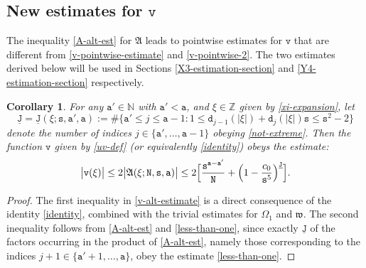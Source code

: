 \documentclass[12pt, twoside]{article}
\newtheorem{corollary}[theorem]{Corollary}
\theoremstyle{definition}
\numberwithin{equation}{section}
\begin{document}
\subsection{New estimates for $\mathtt v$}
\noindent The inequality \eqref{A-alt-est} for $\mathfrak A$ leads to pointwise estimates for $\mathtt v$ that are different from \eqref{v-pointwise-estimate} and \eqref{v-pointwise-2}. The two estimates derived below will be used in Sections \ref{X3-estimation-section} and \ref{Y4-estimation-section} respectively. 
\begin{corollary} \label{v-alt-cor}
For any $\mathtt a' \in \mathbb N$ with $\mathtt a' < \mathtt a$, and $\xi \in \mathbb Z$ given by \eqref{xi-expansion}, let
\begin{equation} \label{def-cardinality-J-bar}
\underline{\mathtt J} = \underline{\mathtt J}(\xi; \mathtt s, \mathtt a', \mathtt a) :=  \# \bigl\{ \mathtt a' \leq j \leq \mathtt a-1 : 1 \leq \mathtt d_{j-1}(|\xi|) + \mathtt d_j(|\xi|) \mathtt s \leq \mathtt s^2-2 \bigr\}
\end{equation} 
denote the number of indices $j \in \{\mathtt a', \ldots, \mathtt a-1\}$ obeying \eqref{not-extreme}. Then the function $\mathtt v$ given by \eqref{uv-def} (or equivalently \eqref{identity}) obeys the estimate: 
\begin{equation} \label{v-alt-estimate} 
\bigl| \mathtt v(\xi) \bigr| \leq 2\bigl| \mathfrak A(\xi; \mathtt N, \mathtt s, \mathtt a)\bigr| \leq 2 \Bigl[\frac{\mathtt s^{\mathtt a-\mathtt a'}}{\mathtt N} + \left(1 - \frac{c_0}{\mathtt s^{5}} \right)^{\underline{\mathtt J}} \Bigr].
\end{equation} 
\end{corollary} 
\begin{proof} 
The first inequality in \eqref{v-alt-estimate} is a direct consequence of the identity \eqref{identity}, combined with the trivial estimates for $\Omega_1$ and $\mathfrak w$. The second inequality follows from \eqref{A-alt-est} and \eqref{less-than-one}, since exactly $\underline{\mathtt J}$ of the factors occurring in the product of \eqref{A-alt-est}, namely those corresponding to the indices $j + 1 \in \{\mathtt a'+1, \ldots, \mathtt a\}$, obey the estimate \eqref{less-than-one}.  
\end{proof} 
\end{document}
